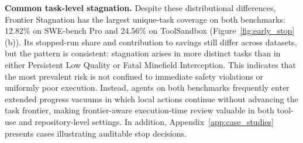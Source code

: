 \textbf{Common task-level stagnation.} Despite these distributional differences, Frontier Stagnation has the largest unique-task coverage on both benchmarks: 12.82\% on SWE-bench Pro and 24.56\% on ToolSandbox (Figure~\ref{fig:early_stop}(b)). Its stopped-run share and contribution to savings still differ across datasets, but the pattern is consistent: stagnation arises in more distinct tasks than in either Persistent Low Quality or Fatal Minefield Interception. This indicates that the most prevalent risk is not confined to immediate safety violations or uniformly poor execution. Instead, agents on both benchmarks frequently enter extended progress vacuums in which local actions continue without advancing the task frontier, making frontier-aware execution-time review valuable in both tool-use and repository-level settings.
In addition, Appendix~\ref{app:case_studies} presents cases illustrating auditable stop decisions.
